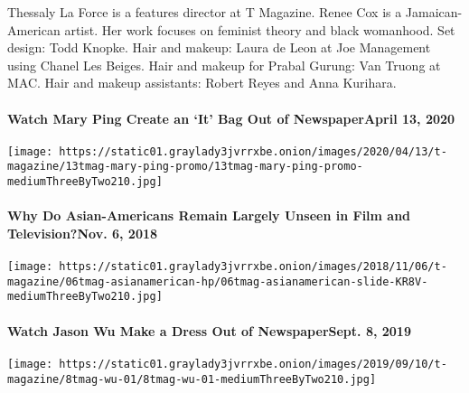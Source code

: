 Thessaly La Force is a features director at T Magazine. Renee Cox is a
Jamaican-American artist. Her work focuses on feminist theory and black
womanhood. Set design: Todd Knopke. Hair and makeup: Laura de Leon at
Joe Management using Chanel Les Beiges. Hair and makeup for Prabal
Gurung: Van Truong at MAC. Hair and makeup assistants: Robert Reyes and
Anna Kurihara.

\href{https://www.nytimes3xbfgragh.onion/2020/04/13/t-magazine/mary-ping-newspaper-bag.html}{}

\hypertarget{watch-mary-ping-create-an-it-bag-out-of-newspaperapril-13-2020}{%
\paragraph{Watch Mary Ping Create an `It' Bag Out of NewspaperApril 13,
2020}\label{watch-mary-ping-create-an-it-bag-out-of-newspaperapril-13-2020}}

\texttt{[image: https://static01.graylady3jvrrxbe.onion/images/2020/04/13/t-magazine/13tmag-mary-ping-promo/13tmag-mary-ping-promo-mediumThreeByTwo210.jpg]}
\href{https://www.nytimes3xbfgragh.onion/2018/11/06/t-magazine/asian-american-actors-representation.html}{}

\hypertarget{why-do-asian-americans-remain-largely-unseen-in-film-and-televisionnov-6-2018}{%
\paragraph{Why Do Asian-Americans Remain Largely Unseen in Film and
Television?Nov. 6,
2018}\label{why-do-asian-americans-remain-largely-unseen-in-film-and-televisionnov-6-2018}}

\texttt{[image: https://static01.graylady3jvrrxbe.onion/images/2018/11/06/t-magazine/06tmag-asianamerican-hp/06tmag-asianamerican-slide-KR8V-mediumThreeByTwo210.jpg]}
\href{https://www.nytimes3xbfgragh.onion/2019/09/08/t-magazine/jason-wu-newspaper-dress.html}{}

\hypertarget{watch-jason-wu-make-a-dress-out-of-newspapersept-8-2019}{%
\paragraph{Watch Jason Wu Make a Dress Out of NewspaperSept. 8,
2019}\label{watch-jason-wu-make-a-dress-out-of-newspapersept-8-2019}}

\texttt{[image: https://static01.graylady3jvrrxbe.onion/images/2019/09/10/t-magazine/8tmag-wu-01/8tmag-wu-01-mediumThreeByTwo210.jpg]}
\href{https://www.nytimes3xbfgragh.onion/2019/08/26/t-magazine/asian-american-comedians.html}{}

